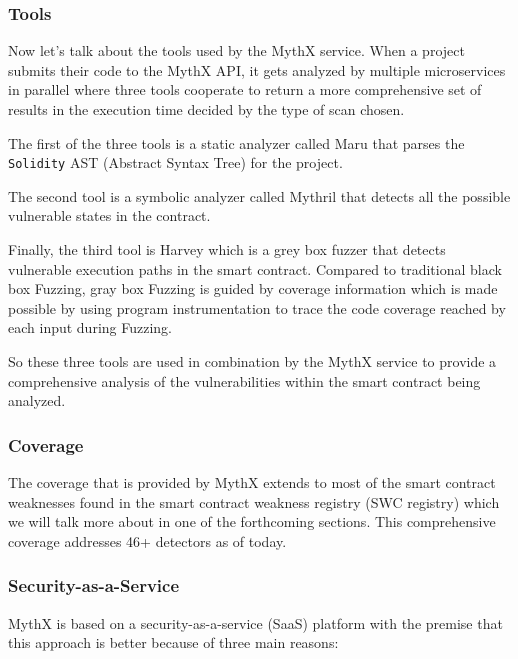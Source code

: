 \subsubsection{Tools}\label{tools}

Now let's talk about the tools used by the MythX service. When a project
submits their code to the MythX API, it gets analyzed by multiple
microservices in parallel where three tools cooperate to return a more
comprehensive set of results in the execution time decided by the type
of scan chosen.

The first of the three tools is a static analyzer called Maru that
parses the \texttt{Solidity} AST (Abstract Syntax Tree) for the project.

The second tool is a symbolic analyzer called Mythril that detects all
the possible vulnerable states in the contract.

Finally, the third tool is Harvey which is a grey box fuzzer that
detects vulnerable execution paths in the smart contract. Compared to
traditional black box Fuzzing, gray box Fuzzing is guided by coverage
information which is made possible by using program instrumentation to
trace the code coverage reached by each input during Fuzzing.

So these three tools are used in combination by the MythX service to
provide a comprehensive analysis of the vulnerabilities within the smart
contract being analyzed.

\subsubsection{Coverage}\label{coverage}

The coverage that is provided by MythX extends to most of the smart
contract weaknesses found in the smart contract weakness registry (SWC
registry) which we will talk more about in one of the forthcoming
sections. This comprehensive coverage addresses 46+ detectors as of
today.

\subsubsection{Security-as-a-Service}\label{security-as-a-service}

MythX is based on a security-as-a-service (SaaS) platform with the
premise that this approach is better because of three main reasons:

